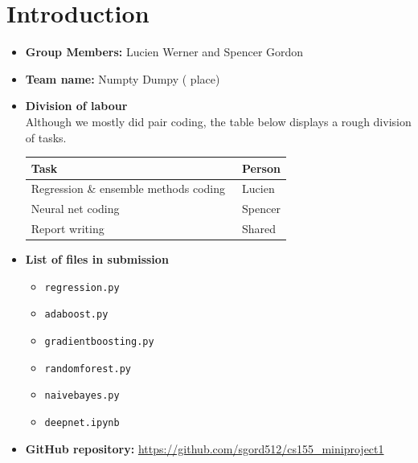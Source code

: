 \section{Introduction}
\medskip
\begin{itemize}
  
\item \textbf{Group Members:} Lucien Werner and Spencer Gordon
  
\item \textbf{Team name:} Numpty Dumpy ( place)
  
\item \textbf{Division of labour} \\
  Although we mostly did pair coding, the table below displays a rough division of tasks. 
  \begin{table}[h]
    \centering
    \begin{tabular}{l|l}
      Task                                   & Person   \\ 
      \hline
      Regression \& ensemble methods coding~ & Lucien  \\
      Neural net coding                      & Spencer  \\
      Report writing                         & Shared  
    \end{tabular}
  \end{table}
  
\item \textbf{List of files in submission}
  \begin{itemize}
  \item \texttt{regression.py}	
  \item \texttt{adaboost.py}	
  \item \texttt{gradientboosting.py}	
  \item \texttt{randomforest.py}	
  \item \texttt{naivebayes.py}
  \item \texttt{deepnet.ipynb}	
    
    
    
    
  \end{itemize}
\item \textbf{GitHub repository:} \url{https://github.com/sgord512/cs155_miniproject1}
\end{itemize}



